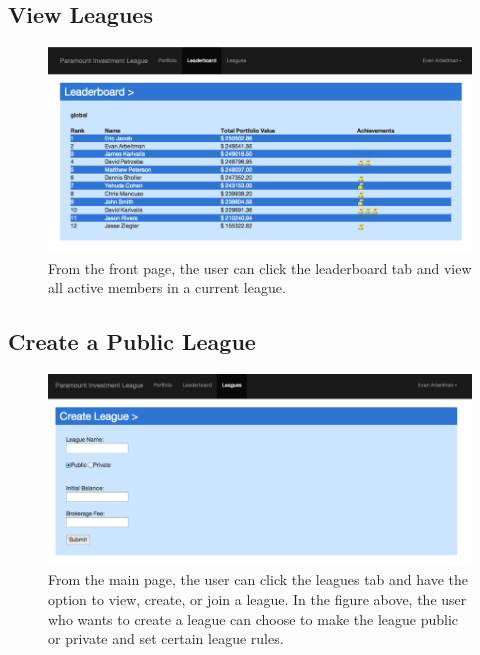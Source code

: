 \subsection{View Leagues}
\begin{figure}[H]
\centering
\includegraphics[width=5.5in]{./img/ui/5.png}
\caption{From the front page, the user can click the leaderboard tab and view all active members in a current league.}
\end{figure}

\subsection{Create a Public League}
\begin{figure}[H]
\centering
\includegraphics[width=5.5in]{./img/ui/6.png}
\caption{From the main page, the user can click the leagues tab and have the option to view, create, or join a league. In the figure above, the user who wants to create a league can choose to make the league public or private and set certain league rules.}
\end{figure}

